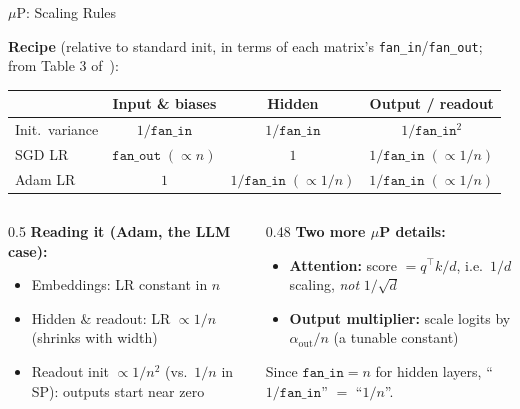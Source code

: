 \begin{frame}{$\mu$P: Scaling Rules}

  \textbf{Recipe} (relative to standard init, in terms of each matrix's \texttt{fan\_in}/\texttt{fan\_out}; from Table 3 of~\cite{yang2022muP}):

  \vspace{0.3em}
  \begin{center}
    \renewcommand{\arraystretch}{1.35}
    \begin{tabular}{lccc}
      \toprule
      & \textbf{Input \& biases} & \textbf{Hidden} & \textbf{Output / readout} \\
      \midrule
      Init.\ variance & $1/\texttt{fan\_in}$ & $1/\texttt{fan\_in}$ & $1/\texttt{fan\_in}^2$ \\
      SGD LR & $\texttt{fan\_out}\;(\propto n)$ & $1$ & $1/\texttt{fan\_in}\;(\propto 1/n)$ \\
      Adam LR & $1$ & $1/\texttt{fan\_in}\;(\propto 1/n)$ & $1/\texttt{fan\_in}\;(\propto 1/n)$ \\
      \bottomrule
    \end{tabular}
  \end{center}

  \vspace{0.3em}
  \begin{columns}[T]
    \begin{column}{0.5\textwidth}
      \textbf{Reading it (Adam, the LLM case):}
      \begin{itemize}
        \item Embeddings: LR constant in $n$
        \item Hidden \& readout: LR $\propto 1/n$ (shrinks with width)
        \item Readout init $\propto 1/n^2$ (vs.\ $1/n$ in SP): outputs start near zero
      \end{itemize}
    \end{column}
    \begin{column}{0.48\textwidth}
      \textbf{Two more $\mu$P details:}
      \begin{itemize}
        \item \textbf{Attention:} score $= q^\top k / d$, i.e.\ $1/d$ scaling, \emph{not} $1/\sqrt{d}$
        \item \textbf{Output multiplier:} scale logits by $\alpha_{\text{out}}/n$ (a tunable constant)
      \end{itemize}
      {\scriptsize Since $\texttt{fan\_in}=n$ for hidden layers, ``$1/\texttt{fan\_in}$'' $=$ ``$1/n$''.}
    \end{column}
  \end{columns}
\end{frame}

